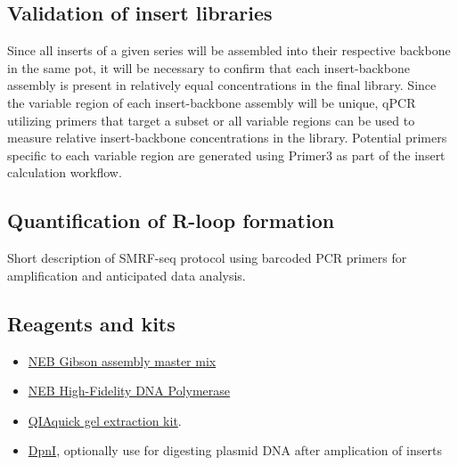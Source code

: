 \documentclass[11pt]{article}
\begin{document}
\subsection{Validation of insert libraries}

Since all inserts of a given series will be assembled into their respective backbone in the same pot, it will be necessary to confirm that each insert-backbone assembly is present in relatively equal concentrations in the final library. Since the variable region of each insert-backbone assembly will be unique, qPCR utilizing primers that target a subset or all variable regions can be used to measure relative insert-backbone concentrations in the library. Potential primers specific to each variable region are generated using Primer3 as part of the insert calculation workflow.

\subsection{Quantification of R-loop formation }

Short description of SMRF-seq protocol using barcoded PCR primers for amplification 
and anticipated data analysis. 

\subsection{Reagents and kits}

\begin{itemize}
	\item \href{https://www.neb.com/products/e2611-gibson-assembly-master-mix#Product\%20Information_Properties\%20\&\%20Usage}{NEB Gibson assembly master mix}
	\item \href{https://www.neb.com/products/m0491-q5-high-fidelity-dna-polymerase#Product\%20Information}{NEB High-Fidelity DNA Polymerase}
	\item \href{https://www.qiagen.com/us/products/discovery-translational-research/dna-rna-purification/dna-purification/dna-clean-up/qiaquick-gel-extraction-kit/#orderinginformation/}{QIAquick gel extraction kit}. 
	\item \href{https://www.neb.com/products/r0176-dpni?__cf_chl_jschl_tk__=d22d8cb49b9b2d4ff2532de61875fea36af4066f-1626291600-0-ARBMmni5PdhcCrqckk9zN05YGR50cB-otICbDTrUStRYlPQzdrbyJvjEOoI2QusMU-HOcKBcontIQfQRYoQqN9R2hNCL0XzFa2hP3-_c6Vf1sL2Sb2Bs_DXW38t8Oc1NxSg0caQ4FlAGqVNswAJaml9BhLC5dWj1sCuqKwDj72JKO8eI9d3mlCcNVIAVs8n1xFpuo1_oyafffkTnQ-ysv358pg1RrIbChfkwqXctDQennQm_CRjVjuitrXFFNjgAqBDJBKFRMZKkoOYlTDEDBsuaQaQtMxNwL5u7yIJ5mNCrkkuiikIGg7Was3tNj1d7D-7bnJrfXr8jIfG3qW6kvIkrZBJey0JQAVMQGVc4Ps0t0_iS3P4ahcZRytZezR6Fq9lrMqGJkB_Xmxyr0cVoXrbIv136yLISC-RPNR4MDWXe#Product\%20Information}{DpnI}, optionally use for digesting plasmid DNA after amplication of inserts
\end{itemize}
\end{document}
